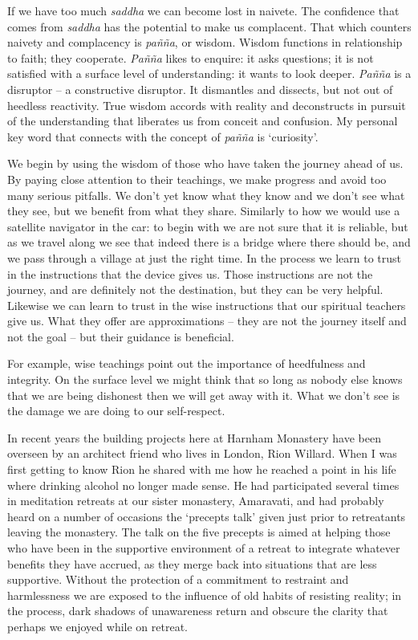 If we have too much \emph{saddha} we can become lost in naivete. The
confidence that comes from \emph{saddha} has the potential to make us
complacent. That which counters naivety and complacency is \emph{pañña},
or wisdom. Wisdom functions in relationship to faith; they cooperate.
\emph{Pañña} likes to enquire: it asks questions; it is not satisfied
with a surface level of understanding: it wants to look deeper.
\emph{Pañña} is a disruptor -- a constructive disruptor. It dismantles
and dissects, but not out of heedless reactivity. True wisdom accords
with reality and deconstructs in pursuit of the understanding that
liberates us from conceit and confusion. My personal key word that
connects with the concept of \emph{pañña} is `curiosity'.

We begin by using the wisdom of those who have taken the journey ahead
of us. By paying close attention to their teachings, we make progress
and avoid too many serious pitfalls. We don't yet know what they know
and we don't see what they see, but we benefit from what they share.
Similarly to how we would use a satellite navigator in the car: to begin
with we are not sure that it is reliable, but as we travel along we see
that indeed there is a bridge where there should be, and we pass through
a village at just the right time. In the process we learn to trust in
the instructions that the device gives us. Those instructions are not
the journey, and are definitely not the destination, but they can be
very helpful. Likewise we can learn to trust in the wise instructions
that our spiritual teachers give us. What they offer are approximations
-- they are not the journey itself and not the goal -- but their
guidance is beneficial.

For example, wise teachings point out the importance of heedfulness and
integrity. On the surface level we might think that so long as nobody
else knows that we are being dishonest then we will get away with it.
What we don't see is the damage we are doing to our self-respect.

In recent years the building projects here at Harnham Monastery have
been overseen by an architect friend who lives in London, Rion Willard.
When I was first getting to know Rion he shared with me how he reached a
point in his life where drinking alcohol no longer made sense. He had
participated several times in meditation retreats at our sister
monastery, Amaravati, and had probably heard on a number of occasions
the `precepts talk' given just prior to retreatants leaving the
monastery. The talk on the five precepts is aimed at helping those who
have been in the supportive environment of a retreat to integrate
whatever benefits they have accrued, as they merge back into situations
that are less supportive. Without the protection of a commitment to
restraint and harmlessness we are exposed to the influence of old habits
of resisting reality; in the process, dark shadows of unawareness return
and obscure the clarity that perhaps we enjoyed while on retreat.


